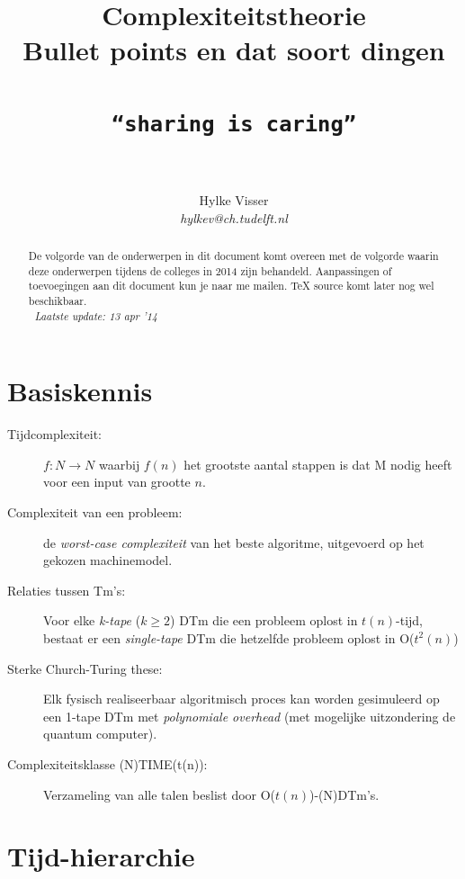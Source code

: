 \documentclass[]{article}
\begin{document}
\title{\textbf{Complexiteitstheorie} \\ Bullet points en dat soort dingen \\ ~ \\ \texttt{``sharing is caring''} \\ ~}
\author{Hylke Visser \\ \textit{hylkev@ch.tudelft.nl}}
\date{}
\maketitle

\renewcommand{\abstractname}{}

\begin{abstract}
De volgorde van de onderwerpen in dit document komt overeen met de volgorde waarin deze onderwerpen tijdens de colleges in 2014 zijn behandeld. Aanpassingen of toevoegingen aan dit document kun je naar me mailen. TeX source komt later nog wel beschikbaar. \\ $~$ \hfill \textit{Laatste update: 13 apr '14}
\end{abstract}

\section*{Basiskennis}

\begin{description}
\item[Tijdcomplexiteit:] $f : N \rightarrow N$ waarbij $f(n)$ het grootste aantal stappen is dat M nodig heeft voor een input van grootte $n$.
\item[Complexiteit van een probleem:] de \textit{worst-case complexiteit} van het beste algoritme, uitgevoerd op het gekozen machinemodel.
\item[Relaties tussen Tm's:] Voor elke \textit{k-tape} ($k \geq 2$) DTm die een probleem oplost in $t(n)$-tijd, bestaat er een \textit{single-tape} DTm die hetzelfde probleem oplost in O($t^2(n)$)
\item[Sterke Church-Turing these:] Elk fysisch realiseerbaar algoritmisch proces kan worden gesimuleerd op een 1-tape DTm met \textit{polynomiale overhead} (met mogelijke uitzondering de quantum computer).
\item[Complexiteitsklasse (N)TIME(t(n)):] Verzameling van alle talen beslist door O($t(n)$)-(N)DTm's.
\end{description}

\section*{Tijd-hierarchie}
\end{document}
